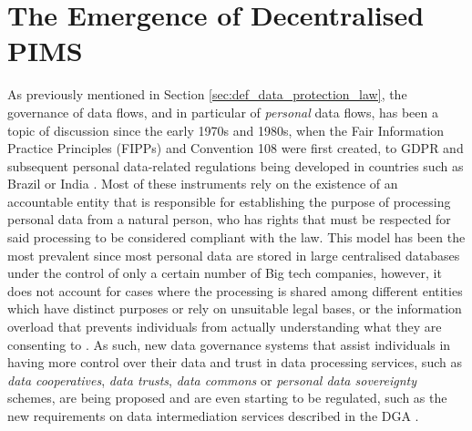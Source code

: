 \section{The Emergence of Decentralised PIMS}
\label{sec:motivation_legal}

As previously mentioned in Section \ref{sec:def_data_protection_law}, the governance of data flows, and in particular of \textit{personal} data flows, has been a topic of discussion since the early 1970s and 1980s, when the Fair Information Practice Principles (FIPPs) \citep{cate_failure_2006} and Convention 108 \citep{council_of_europe_convention_1981} were first created, to GDPR and subsequent personal data-related regulations being developed in countries such as Brazil or India \citep{bradford_brussels_2019}.
Most of these instruments rely on the existence of an accountable entity that is responsible for establishing the purpose of processing personal data from a natural person, who has rights that must be respected for said processing to be considered compliant with the law.
This model has been the most prevalent since most personal data are stored in large centralised databases under the control of only a certain number of Big tech companies, however, it does not account for cases where the processing is shared among different entities which have distinct purposes or rely on unsuitable legal bases, or the information overload that prevents individuals from actually understanding what they are consenting to \citep{benshahar_more_2014}.
As such, new data governance systems that assist individuals in having more control over their data and trust in data processing services, such as \textit{data cooperatives}, \textit{data trusts}, \textit{data commons} or \textit{personal data sovereignty} schemes, are being proposed \citep{viljoen_relational_2021,craglia_digitranscope_2021} and are even starting to be regulated, such as the new requirements on data intermediation services described in the DGA \citeyearpar{noauthor_regulation_2022}.

